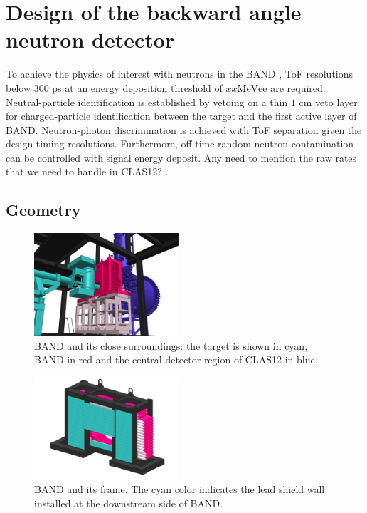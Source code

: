 \documentclass[3p,final,twocolumn]{elsarticle}
\begin{document}

\section{Design of the backward angle neutron detector}
To achieve the physics of interest with neutrons in the BAND \cite{band-proposal}, ToF resolutions below $300$ \si{\pico\second} at an energy deposition threshold of $xx \mathrm{MeVee}$ are required. Neutral-particle identification is established by vetoing on a thin $1$ \si{\centi\meter} veto layer for charged-particle identification between the target and the first active layer of BAND. Neutron-photon discrimination is achieved with ToF separation given the design 
timing resolutions. Furthermore, off-time random neutron contamination can be controlled with signal energy deposit. {\color{red} Any need to mention 
the raw rates that we need to handle in CLAS12?} .

\subsection{Geometry}

\begin{figure}[ht]
	\centering
		\includegraphics[width=0.48\textwidth]{FULL_CONTEXT_STUDIE_3.png}
		\caption{BAND and its close surroundings: the target is shown in cyan,  BAND in red and the central detector region of CLAS12 in blue. }
		\label{fig:bandtarget}
\end{figure}


\begin{figure}[ht]
	\centering
	\includegraphics[width=0.48\textwidth]{BAND_1-2.png}
		\caption{BAND and its frame. The cyan color indicates the lead shield wall installed at the downstream side of BAND.}
		\label{fig:band}
\end{figure}
\end{document}
